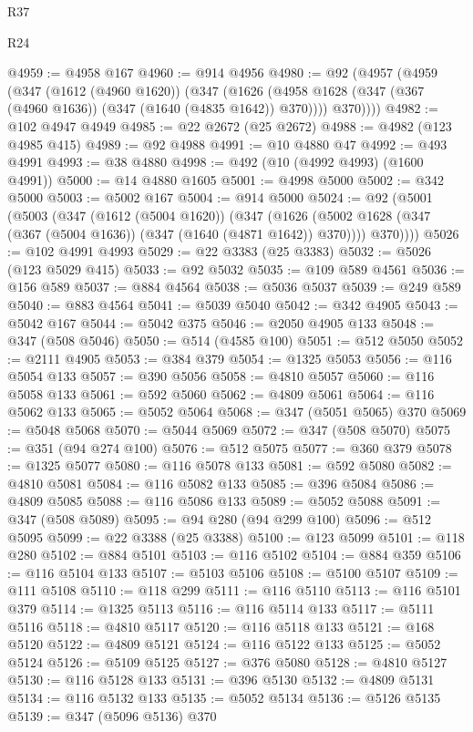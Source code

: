 \begin{lexlean}{R37}
\begin{lexlean}{R24}
\begin{coremodule}
{{{{{{{{{{{{{{{{{{{{{{{{{{{{{{{{{{{{{{{{{{{{{{{{{{{{{{{{{{{{{{{{{{{{{{{{{{{{{{{{{{{{{{{{{{{{{{{{{{{{{{{{{{{{{{{{{{{{{{{{{{{{{{{{{{{{{{{{{{{{{{{{{{{{{{{{{{{{{{{{{{{{{{{{{{{{{{{{{{{{{{{{{@4959 := @4958 @167
@4960 := @914 @4956
@4980 := @92
    (@4957
      (@4959
        (@347
          (@1612 (@4960 @1620))
          (@347
            (@1626 (@4958 @1628 (@347 (@367 (@4960 @1636)) (@347 (@1640 (@4835 @1642)) @370))))
            @370))))
@4982 := @102 @4947 @4949
@4985 := @22 @2672 (@25 @2672)
@4988 := @4982 (@123 @4985 @415)
@4989 := @92 @4988
@4991 := @10 @4880 @47
@4992 := @493 @4991
@4993 := @38 @4880
@4998 := @492 (@10 (@4992 @4993) (@1600 @4991))
@5000 := @14 @4880 @1605
@5001 := @4998 @5000
@5002 := @342 @5000
@5003 := @5002 @167
@5004 := @914 @5000
@5024 := @92
    (@5001
      (@5003
        (@347
          (@1612 (@5004 @1620))
          (@347
            (@1626 (@5002 @1628 (@347 (@367 (@5004 @1636)) (@347 (@1640 (@4871 @1642)) @370))))
            @370))))
@5026 := @102 @4991 @4993
@5029 := @22 @3383 (@25 @3383)
@5032 := @5026 (@123 @5029 @415)
@5033 := @92 @5032
@5035 := @109 @589 @4561
@5036 := @156 @589
@5037 := @884 @4564
@5038 := @5036 @5037
@5039 := @249 @589
@5040 := @883 @4564
@5041 := @5039 @5040
@5042 := @342 @4905
@5043 := @5042 @167
@5044 := @5042 @375
@5046 := @2050 @4905 @133
@5048 := @347 (@508 @5046)
@5050 := @514 (@4585 @100)
@5051 := @512 @5050
@5052 := @2111 @4905
@5053 := @384 @379
@5054 := @1325 @5053
@5056 := @116 @5054 @133
@5057 := @390 @5056
@5058 := @4810 @5057
@5060 := @116 @5058 @133
@5061 := @592 @5060
@5062 := @4809 @5061
@5064 := @116 @5062 @133
@5065 := @5052 @5064
@5068 := @347 (@5051 @5065) @370
@5069 := @5048 @5068
@5070 := @5044 @5069
@5072 := @347 (@508 @5070)
@5075 := @351 (@94 @274 @100)
@5076 := @512 @5075
@5077 := @360 @379
@5078 := @1325 @5077
@5080 := @116 @5078 @133
@5081 := @592 @5080
@5082 := @4810 @5081
@5084 := @116 @5082 @133
@5085 := @396 @5084
@5086 := @4809 @5085
@5088 := @116 @5086 @133
@5089 := @5052 @5088
@5091 := @347 (@508 @5089)
@5095 := @94 @280 (@94 @299 @100)
@5096 := @512 @5095
@5099 := @22 @3388 (@25 @3388)
@5100 := @123 @5099
@5101 := @118 @280
@5102 := @884 @5101
@5103 := @116 @5102
@5104 := @884 @359
@5106 := @116 @5104 @133
@5107 := @5103 @5106
@5108 := @5100 @5107
@5109 := @111 @5108
@5110 := @118 @299
@5111 := @116 @5110
@5113 := @116 @5101 @379
@5114 := @1325 @5113
@5116 := @116 @5114 @133
@5117 := @5111 @5116
@5118 := @4810 @5117
@5120 := @116 @5118 @133
@5121 := @168 @5120
@5122 := @4809 @5121
@5124 := @116 @5122 @133
@5125 := @5052 @5124
@5126 := @5109 @5125
@5127 := @376 @5080
@5128 := @4810 @5127
@5130 := @116 @5128 @133
@5131 := @396 @5130
@5132 := @4809 @5131
@5134 := @116 @5132 @133
@5135 := @5052 @5134
@5136 := @5126 @5135
@5139 := @347 (@5096 @5136) @370
}}}}}}}}}}}}}}}}}}}}}}}}}}}}}}}}}}}}}}}}}}}}}}}}}}}}}}}}}}}}}}}}}}}}}}}}}}}}}}}}}}}}}}}}}}}}}}}}}}}}}}}}}}}}}}}}}}}}}}}}}}}}}}}}}}}}}}}}}}}}}}}}}}}}}}}}}}}}}}}}}}}}}}}}}}}}}}}}}}}}}}}}}
\end{coremodule}
\end{lexlean}
\end{lexlean}
